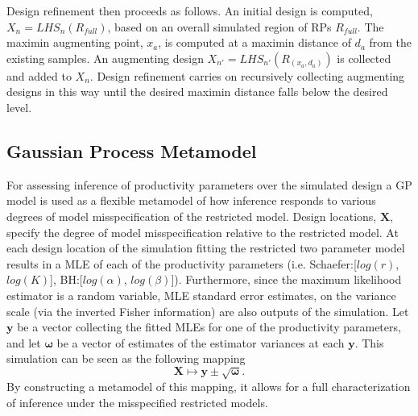 \documentclass[12pt]{article}
\begin{document}
%
Design refinement then proceeds as follows. An initial design is computed, $X_{n} = LHS_{n}(R_{full})$, %
based on an overall simulated region of RPs $R_{full}$. The maximin augmenting 
point, $x_a$, is computed at a maximin distance of $d_a$ from the existing samples. 
An augmenting design $X_{n'} = LHS_{n'}(R_{(x_a, d_a)})$ is collected and 
added to $X_n$. Design refinement carries on recursively collecting augmenting 
designs in this way until the desired maximin distance falls below the desired 
level.
 




%  
%
%




%
\subsection{Gaussian Process Metamodel}
%

%
For assessing inference of productivity parameters over the simulated design %
a GP model is used as a flexible metamodel of how inference responds to various 
degrees of model misspecification of the restricted model. 
%
Design locations, $\bm{X}$, specify the degree of model misspecification relative 
to the restricted model.
%
At each design location of the simulation fitting the restricted two parameter 
model results in a MLE of each of the productivity parameters 
(i.e. Schaefer:[$log(r)$, $log(K)$], BH:[$log(\alpha)$, $log(\beta)$]).
%
Furthermore, since the maximum likelihood estimator is a random variable, 
MLE standard error estimates, on the variance scale (via the inverted Fisher 
information) are also outputs of the simulation.
%
Let $\textbf{y}$ be a vector collecting the fitted MLEs for one of the 
productivity parameters, and let $\bm{\omega}$ be a vector of estimates of the 
estimator variances at each $\textbf{y}$. 
%
This simulation can be seen as the following mapping
\begin{equation}
\bm{X} \mapsto \textbf{y} \pm \sqrt{\bm{\omega}}.
\end{equation}
By constructing a metamodel of this mapping, it allows for a full
characterization of inference under the misspecified restricted models.
\end{document}
